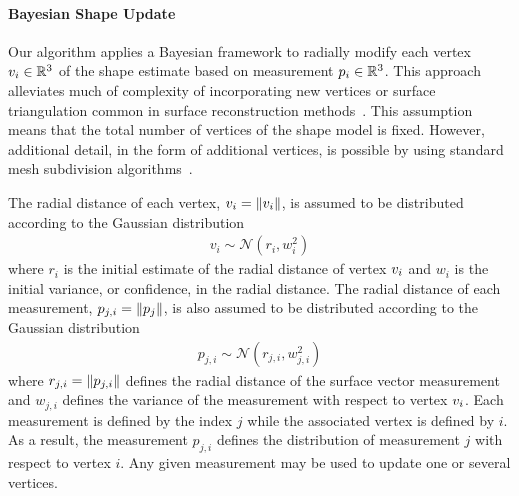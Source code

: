 \documentclass[journal]{new-aiaa}
\begin{document}
\paragraph{Bayesian Shape Update}

Our algorithm applies a Bayesian framework to radially modify each vertex \( v_i \in \mathbb{R}^3\) of the shape estimate based on measurement \( p_i \in \mathbb{R}^3 \). 
This approach alleviates much of complexity of incorporating new vertices or surface triangulation common in surface reconstruction methods~\cite{berg2008}.
This assumption means that the total number of vertices of the shape model is fixed.
However, additional detail, in the form of additional vertices, is possible by using standard mesh subdivision algorithms~\cite{orourke1998}.

The radial distance of each vertex, \( v_i = \left\| v_i \right\|\), is assumed to be distributed according to the Gaussian distribution
\begin{align*}
    v_i \sim \mathcal{N}(r_i, w_i^2)
\end{align*}
where \( r_i \) is the initial estimate of the radial distance of vertex \( v_i\) and \( w_i \) is the initial variance, or confidence, in the radial distance.
The radial distance of each measurement, \( p_{j,i} = \left\| p_j \right\|\), is also assumed to be distributed according to the Gaussian distribution
\begin{align*}
    p_{j,i} \sim \mathcal{N}(r_{j,i}, w_{j,i}^2)
\end{align*}
where \( r_{j,i} = \left\| p_{j,i} \right\| \) defines the radial distance of the surface vector measurement and \( w_{j, i}\) defines the variance of the measurement with respect to vertex \( v_i\).
Each measurement is defined by the index \( j \) while the associated vertex is defined by \( i \). 
As a result, the measurement \( p_{j, i} \) defines the distribution of measurement \( j \) with respect to vertex \( i \). 
Any given measurement may be used to update one or several vertices.
\end{document}
